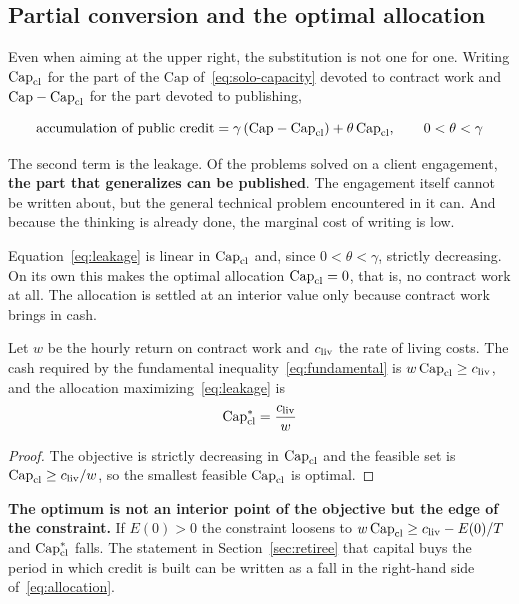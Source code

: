 \subsection{Partial conversion and the optimal allocation}

Even when aiming at the upper right, the substitution is not one for one. Writing $\mathrm{Cap}_{\mathrm{cl}}$ for
the part of the $\mathrm{Cap}$ of~\eqref{eq:solo-capacity} devoted to contract work and
$\mathrm{Cap}-\mathrm{Cap}_{\mathrm{cl}}$ for the part devoted to publishing,

\begin{equation}
\text{accumulation of public credit} = \gamma\,(\mathrm{Cap}-\mathrm{Cap}_{\mathrm{cl}}) + \theta\,\mathrm{Cap}_{\mathrm{cl}},
\qquad 0<\theta<\gamma
\label{eq:leakage}
\end{equation}

The second term is the leakage. Of the problems solved on a client engagement,
\textbf{the part that generalizes can be published}. The engagement itself cannot be written
about, but the general technical problem encountered in it can. And because the thinking is
already done, the marginal cost of writing is low.

Equation~\eqref{eq:leakage} is linear in $\mathrm{Cap}_{\mathrm{cl}}$ and, since $0<\theta<\gamma$, strictly
decreasing. On its own this makes the optimal allocation $\mathrm{Cap}_{\mathrm{cl}}=0$, that is, no contract work
at all. The allocation is settled at an interior value only because contract work brings in
cash.

\begin{proposition}
\label{prop:allocation}
Let $w$ be the hourly return on contract work and $c_{\rm liv}$ the rate of living costs.
The cash required by the fundamental inequality~\eqref{eq:fundamental} is
$w\,\mathrm{Cap}_{\mathrm{cl}}\geq c_{\rm liv}$, and the allocation maximizing~\eqref{eq:leakage} is
\begin{equation}
\mathrm{Cap}_{\mathrm{cl}}^{\ast} = \frac{c_{\rm liv}}{w}
\label{eq:allocation}
\end{equation}
\end{proposition}

\begin{proof}
The objective is strictly decreasing in $\mathrm{Cap}_{\mathrm{cl}}$ and the feasible set is
$\mathrm{Cap}_{\mathrm{cl}}\geq c_{\rm liv}/w$, so the smallest feasible $\mathrm{Cap}_{\mathrm{cl}}$ is optimal.
\end{proof}

\textbf{The optimum is not an interior point of the objective but the edge of the constraint.}
If $E(0)>0$ the constraint loosens to $w\,\mathrm{Cap}_{\mathrm{cl}}\geq c_{\rm liv} - E(0)/T$ and $\mathrm{Cap}_{\mathrm{cl}}^\ast$
falls. The statement in Section~\ref{sec:retiree} that capital buys the period in which
credit is built can be written as a fall in the right-hand side of~\eqref{eq:allocation}.

